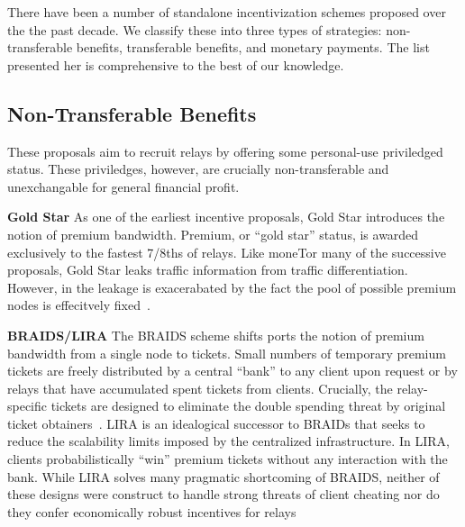 There have been a number of standalone incentivization schemes proposed over the
the past decade. We classify these into three types of strategies:
non-transferable benefits, transferable benefits, and monetary payments. The
list presented her is comprehensive to the best of our knowledge.

\subsection{Non-Transferable Benefits}

These proposals aim to recruit relays by offering some personal-use priviledged
status. These priviledges, however, are crucially non-transferable and
unexchangable for general financial profit. 

\textbf{Gold Star} As one of the earliest incentive proposals, Gold Star introduces the notion of
premium bandwidth. Premium, or ``gold star'' status, is awarded exclusively to
the fastest 7/8ths of relays. Like moneTor many of the successive proposals,
Gold Star leaks traffic information from traffic differentiation. However, in
the leakage is exacerabated by the fact the pool of possible premium nodes is
effecitvely fixed~\cite{dingledine2010building}.

\textbf{BRAIDS/LIRA} The BRAIDS scheme shifts ports the notion of premium
bandwidth from a single node to tickets. Small numbers of temporary premium
tickets are freely distributed by a central ``bank'' to any client upon request
or by relays that have accumulated spent tickets from clients. Crucially, the
relay-specific tickets are designed to eliminate the double spending threat by
original ticket obtainers~\cite{jansen2010recruiting}. LIRA is an idealogical
successor to BRAIDs that seeks to reduce the scalability limits imposed by the
centralized infrastructure. In LIRA, clients probabilistically ``win'' premium
tickets without any interaction with the bank. While LIRA solves many pragmatic
shortcoming of BRAIDS, neither of these designs were construct to handle strong
threats of client cheating nor do they confer economically robust incentives for
relays~\cite{jansen2013lira} 

